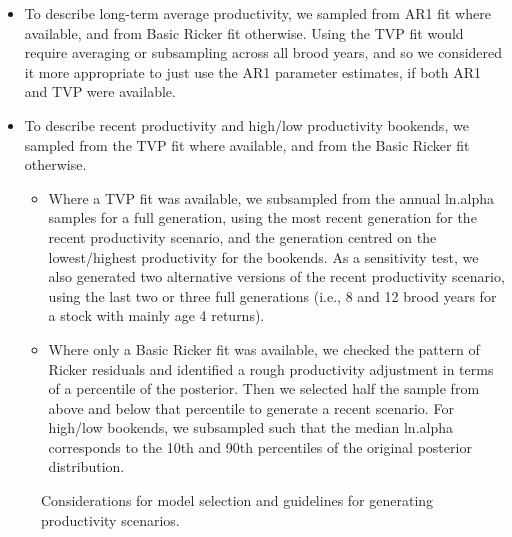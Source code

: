\documentclass[french,11pt]{book}
\begin{document}
\begin{itemize}

\item
  To describe long-term average productivity, we sampled from AR1 fit where available, and from Basic Ricker fit otherwise. Using the TVP fit would require averaging or subsampling across all brood years, and so we considered it more appropriate to just use the AR1 parameter estimates, if both AR1 and TVP were available.
\item
  To describe recent productivity and high/low productivity bookends, we sampled from the TVP fit where available, and from the Basic Ricker fit otherwise.
  \begin{itemize}

  \item
    Where a TVP fit was available, we subsampled from the annual ln.alpha samples for a full generation, using the most recent generation for the recent productivity scenario, and the generation centred on the lowest/highest productivity for the bookends. As a sensitivity test, we also generated two alternative versions of the recent productivity scenario, using the last two or three full generations (i.e., 8 and 12 brood years for a stock with mainly age 4 returns).
  \item
    Where only a Basic Ricker fit was available, we checked the pattern of Ricker residuals and identified a rough productivity adjustment in terms of a percentile of the posterior. Then we selected half the sample from above and below that percentile to generate a recent scenario. For high/low bookends, we subsampled such that the median ln.alpha corresponds to the 10th and 90th percentiles of the original posterior distribution.
  \end{itemize}
\end{itemize}
\clearpage


\begin{figure}[htb]

{\centering {} 

}

\caption{Considerations for model selection and guidelines for generating productivity scenarios.}\label{fig:ModelSelection}
\end{figure}
\clearpage
\end{document}
